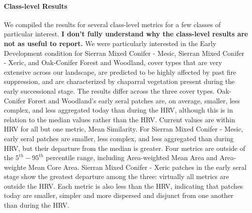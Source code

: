 \paragraph{Class-level Results} We compiled the results for several class-level metrics for a few classes of particular interest. \textbf{I don't fully understand why the class-level results are not as useful to report.} We were particularly interested in the Early Development condition for Sierran Mixed Conifer - Mesic, Sierran Mixed Conifer - Xeric, and Oak-Conifer Forest and Woodland, cover types that are very extensive across our landscape, are predicted to be highly affected by past fire suppression, and are characterized by chaparral vegetation present during the early successional stage. The results differ across the three cover types. Oak-Conifer Forest and Woodland's early seral patches are, on average, smaller, less complex, and less aggregated today than during the HRV, although this is in relation to the median values rather than the HRV. Current values are within HRV for all but one metric, Mean Similarity. For Sierran Mixed Conifer - Mesic, early seral patches are smaller, less complex, and less aggregated than during HRV, but their departure from the median is greater. Four metrics are outside of the $5^{th}-95^{th}$ percentile range, including Area-weighted Mean Area and Area-weighte Mean Core Area. Sierran Mixed Conifer - Xeric patches in the early seral stage show the greatest departure among the three: virtually all metrics are outside the HRV. Each metric is also less than the HRV, indicating that patches today are smaller, simpler and more dispersed and disjunct from one another than during the HRV.

